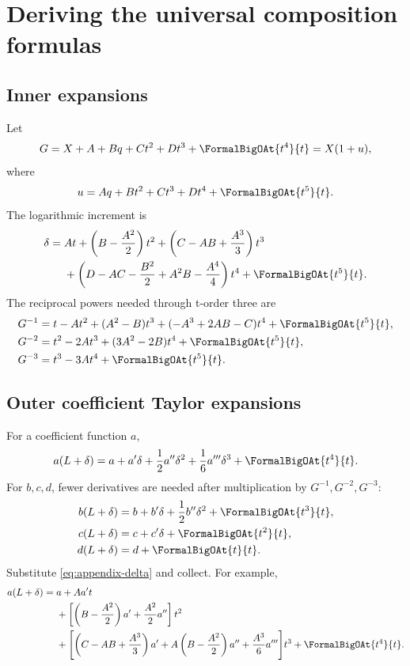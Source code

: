 \documentclass[11pt,openany]{book}
\theoremstyle{definition}
\theoremstyle{plain}
\theoremstyle{remark}
\begin{document}
\chapter{Deriving the universal composition formulas}\label{app:universal-derivation}

\section{Inner expansions}
Let
\[
 G=X+A+Bq+Ct^2+Dt^3+\FormalBigOAt{t^4}{t}
 =X(1+u),
\]
where
\[
 u=Aq+Bt^2+Ct^3+Dt^4+\FormalBigOAt{t^5}{t}.
\]
The logarithmic increment is
\begin{equation}\label{eq:appendix-delta}
\begin{split}
 \delta={}&At+\left(B-\frac{A^2}{2}\right)t^2
 +\left(C-AB+\frac{A^3}{3}\right)t^3\\
 &+\left(D-AC-\frac{B^2}{2}+A^2B-\frac{A^4}{4}\right)t^4
 +\FormalBigOAt{t^5}{t}.
\end{split}
\end{equation}
The reciprocal powers needed through t-order three are
\begin{align}
 G^{-1}={}&t-At^2+(A^2-B)t^3
 +(-A^3+2AB-C)t^4+\FormalBigOAt{t^5}{t},\label{eq:Ginv-app}\\
 G^{-2}={}&t^2-2At^3+(3A^2-2B)t^4+\FormalBigOAt{t^5}{t},\label{eq:Ginv2-app}\\
 G^{-3}={}&t^3-3At^4+\FormalBigOAt{t^5}{t}.\label{eq:Ginv3-app}
\end{align}

\section{Outer coefficient Taylor expansions}
For a coefficient function \(a\),
\begin{equation}\label{eq:a-taylor-app}
 a(L+\delta)
 =a+a'\delta+\frac12a''\delta^2+\frac16a'''\delta^3
 +\FormalBigOAt{t^4}{t}.
\end{equation}
For \(b,c,d\), fewer derivatives are needed after multiplication by
\(G^{-1},G^{-2},G^{-3}\):
\begin{align*}
 b(L+\delta)&=b+b'\delta+\frac12b''\delta^2+\FormalBigOAt{t^3}{t},\\
 c(L+\delta)&=c+c'\delta+\FormalBigOAt{t^2}{t},\\
 d(L+\delta)&=d+\FormalBigOAt{t}{t}.
\end{align*}
Substitute \cref{eq:appendix-delta} and collect.  For example,
\begin{align*}
 a(L+\delta)
={}&a+Aa't\\
&+\left[
 \left(B-\frac{A^2}{2}\right)a'
 +\frac{A^2}{2}a''
 \right]t^2\\
&+\Biggl[
 \left(C-AB+\frac{A^3}{3}\right)a'
 +A\left(B-\frac{A^2}{2}\right)a''
 +\frac{A^3}{6}a'''
 \Biggr]t^3
 +\FormalBigOAt{t^4}{t}.
\end{align*}
\end{document}
